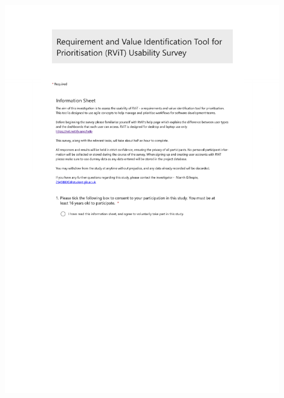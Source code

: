 \documentclass{l4proj}
\begin{document}
\begin{appendices}
\centerline{
\includegraphics[width=0.9\textwidth, pages={1}]{dissertation/appendices/UserEvaluationSurveyForm.pdf}
}





\end{appendices}
\end{document}
